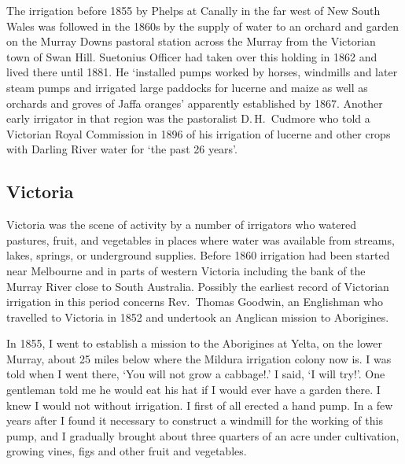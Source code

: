 The irrigation before 1855 by Phelps at Canally  in the
far west of New South Wales was followed in the 1860s by the supply of
water to an orchard  and garden on the Murray Downs
 pastoral station across the Murray from the
Victorian town of Swan Hill.  Suetonius Officer
 had
taken over this holding in 1862 and lived there until 1881.  He
`installed pumps worked by horses, windmills and later steam pumps
 and
irrigated large paddocks for lucerne  and maize
 as well
as orchards and groves of Jaffa oranges' 
 apparently
established by 1867.  Another early irrigator in that region was the
pastoralist D.\,H.~Cudmore  who told a
Victorian Royal Commission in 1896 of his irrigation of lucerne and
other crops with Darling River  water for `the
past 26 years'.

\subsection*{Victoria}

Victoria was the scene of activity by a number of irrigators who
watered pastures,  fruit,  and vegetables
 in places where water was available from str\-eams,
lakes, springs, or underground supplies.  Before 1860 irrigation had
been started near Melbourne  and in parts of western
Victoria including the bank of the Murray River
 close
to South Australia.  Possibly the earliest record of Victorian
irrigation in this period concerns Rev.\ Thomas Goodwin,
 an Englishman
who travelled to Victoria in 1852 and undertook an Anglican mission to
Aborigines.
\begin{Quote}
	In 1855, I went to establish a mission to the Aborigines at
	Yelta, on the lower Murray, about 25 miles below where the
	Mildura  irrigation colony now is.  I was
	told when I went there, `You will not grow a cabbage!.'  I
	said, `I will try!'.  One gentleman told me he would eat his
	hat if I would ever have a garden there.  I knew I would not
	without irrigation.  I first of all erected a hand pump.
	 In a few years after I found it necessary to
	construct a windmill  for the working of this
	pump, and I gradually brought about three quarters of an acre
	under cultivation, growing vines, figs and other fruit and
	vegetables.
\end{Quote}

